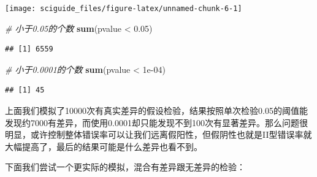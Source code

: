 \documentclass[]{tufte-book}
\newenvironment{Shaded}{}{}
\newcommand{\CommentTok}[1]{\textcolor[rgb]{0.38,0.63,0.69}{\textit{#1}}}
\newcommand{\ControlFlowTok}[1]{\textcolor[rgb]{0.00,0.44,0.13}{\textbf{#1}}}
\newcommand{\DecValTok}[1]{\textcolor[rgb]{0.25,0.63,0.44}{#1}}
\newcommand{\FloatTok}[1]{\textcolor[rgb]{0.25,0.63,0.44}{#1}}
\newcommand{\KeywordTok}[1]{\textcolor[rgb]{0.00,0.44,0.13}{\textbf{#1}}}
\newcommand{\NormalTok}[1]{#1}
\newcommand{\OperatorTok}[1]{\textcolor[rgb]{0.40,0.40,0.40}{#1}}
\newcommand{\OtherTok}[1]{\textcolor[rgb]{0.00,0.44,0.13}{#1}}
\newcommand{\StringTok}[1]{\textcolor[rgb]{0.25,0.44,0.63}{#1}}
\begin{document}
\texttt{[image: sciguide\_files/figure-latex/unnamed-chunk-6-1]}

\begin{Shaded}
\begin{Highlighting}[]
\CommentTok{# 小于0.05的个数}
\KeywordTok{sum}\NormalTok{(pvalue }\OperatorTok{<}\StringTok{ }\FloatTok{0.05}\NormalTok{)}
\end{Highlighting}
\end{Shaded}

\begin{verbatim}
## [1] 6559
\end{verbatim}

\begin{Shaded}
\begin{Highlighting}[]
\CommentTok{# 小于0.0001的个数}
\KeywordTok{sum}\NormalTok{(pvalue }\OperatorTok{<}\StringTok{ }\FloatTok{1e-04}\NormalTok{)}
\end{Highlighting}
\end{Shaded}

\begin{verbatim}
## [1] 45
\end{verbatim}

上面我们模拟了10000次有真实差异的假设检验，结果按照单次检验0.05的阈值能发现约7000有差异，而使用0.0001却只能发现不到100次有显著差异。那么问题很明显，或许控制整体错误率可以让我们远离假阳性，但假阴性也就是II型错误率就大幅提高了，最后的结果可能是什么差异也看不到。

下面我们尝试一个更实际的模拟，混合有差异跟无差异的检验：

\begin{Shaded}
\end{Shaded}
\end{document}
